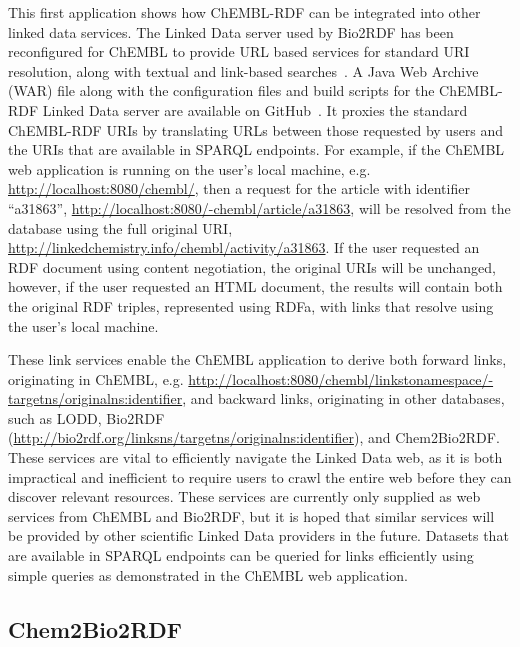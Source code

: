 \documentclass[10pt]{bmc_article}
\newenvironment{bmcformat}{\begin{raggedright}\baselineskip20pt\sloppy\setboolean{publ}{false}}{\end{raggedright}\baselineskip20pt\sloppy}
\begin{document}
\begin{bmcformat}
This first application shows how ChEMBL-RDF can be integrated into other linked data services.
The Linked Data server used by Bio2RDF has been reconfigured for ChEMBL to provide URL
based services for standard URI resolution, along with textual and link-based searches~\cite{Ansell2011}. 
A Java Web Archive (WAR) file along with the configuration files and build scripts for the ChEMBL-RDF Linked Data server are available on GitHub~\cite{WebAppGitHub}. 
It proxies the standard ChEMBL-RDF URIs by translating URLs between those requested by users and the URIs that are available
in SPARQL endpoints. For example, if the ChEMBL web application is running on the user's
local machine, e.g. \url{http://localhost:8080/chembl/}, then a request for the
article with identifier ``a31863'', \url{http://localhost:8080/-chembl/article/a31863},
will be resolved from the database using the full original URI,
\url{http://linkedchemistry.info/chembl/activity/a31863}. If the
user requested an RDF document using content negotiation, the original URIs will be unchanged,
however, if the user requested an HTML document, the results will contain both the
original RDF triples, represented using RDFa, with links that resolve using the user's local machine.

These link services enable the ChEMBL application to derive both forward links, originating in
ChEMBL, e.g. \url{http://localhost:8080/chembl/linkstonamespace/-targetns/originalns:identifier},
and backward links, originating in other databases, such as LODD, Bio2RDF
(\url{http://bio2rdf.org/linksns/targetns/originalns:identifier}), and Chem2Bio2RDF.
These services are vital to efficiently navigate the Linked Data web, as it is both
impractical and inefficient to require users to crawl the entire web before they can discover 
relevant resources. These services are currently only supplied as web services from ChEMBL and
Bio2RDF, but it is hoped that similar services will be provided by other scientific Linked Data
providers in the future. Datasets that are available in SPARQL endpoints can be queried for
links efficiently using simple queries as demonstrated in the ChEMBL web application.

\subsection*{Chem2Bio2RDF}


\end{bmcformat}
\end{document}
